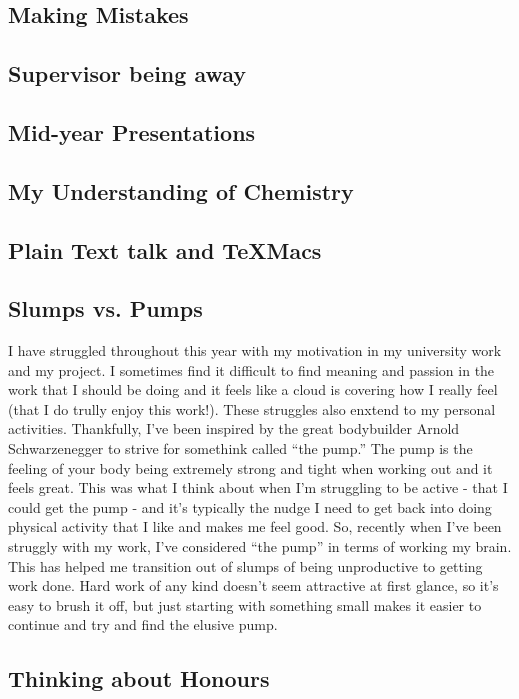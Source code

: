 \documentclass[11pt]{article}
\begin{document}
\subsection{Making Mistakes}
\subsection{Supervisor being away}
\subsection{Mid-year Presentations}
\subsection{My Understanding of Chemistry}
\subsection{Plain Text talk and TeXMacs}
\subsection{Slumps vs. Pumps}

I have struggled throughout this year with my motivation in my university work and my project. I sometimes find it difficult to find meaning and passion in the work that I should be doing and it feels like a cloud is covering how I really feel (that I do trully enjoy this work!). These struggles also enxtend to my personal activities. Thankfully, I've been inspired by the great bodybuilder Arnold Schwarzenegger to strive for somethink called ``the pump.'' The pump is the feeling of your body being extremely strong and tight when working out and it feels great. This was what I think about when I'm struggling to be active - that I could get the pump - and it's typically the nudge I need to get back into doing physical activity that I like and makes me feel good. So, recently when I've been struggly with my work, I've considered ``the pump'' in terms of working my brain. This has helped me transition out of slumps of being unproductive to getting work done. Hard work of any kind doesn't seem attractive at first glance, so it's easy to brush it off, but just starting with something small makes it easier to continue and try and find the elusive pump.

\subsection{Thinking about Honours}
\end{document}

